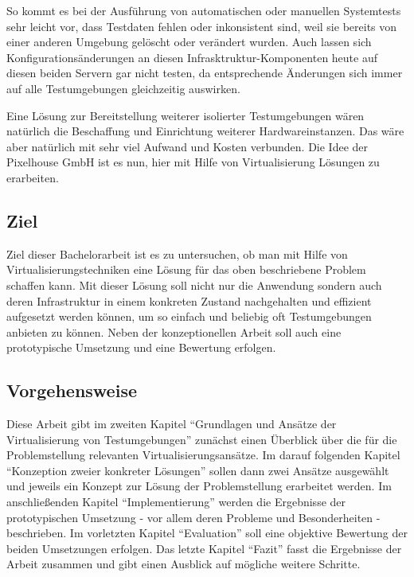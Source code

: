 So kommt es bei der Ausführung von automatischen oder manuellen Systemtests sehr leicht vor, dass Testdaten fehlen oder inkonsistent sind, weil sie bereits von einer anderen Umgebung gelöscht oder verändert wurden. Auch lassen sich Konfigurationsänderungen an diesen Infrasktruktur-Komponenten heute auf diesen beiden Servern gar nicht testen, da entsprechende Änderungen sich immer auf alle Testumgebungen gleichzeitig auswirken.

Eine Lösung zur Bereitstellung weiterer isolierter Testumgebungen wären natürlich die Beschaffung und Einrichtung weiterer Hardwareinstanzen. Das wäre aber natürlich mit sehr viel Aufwand und Kosten verbunden. Die Idee der Pixelhouse GmbH ist es nun, hier mit Hilfe von Virtualisierung Lösungen zu erarbeiten.

\subsection{Ziel}

Ziel dieser Bachelorarbeit ist es zu untersuchen, ob man mit Hilfe von Virtualisierungstechniken eine Lösung für das oben beschriebene Problem schaffen kann. Mit dieser Lösung soll nicht nur die Anwendung sondern auch deren Infrastruktur in einem konkreten Zustand nachgehalten und effizient aufgesetzt werden können, um so einfach und beliebig oft Testumgebungen anbieten zu können. Neben der konzeptionellen Arbeit soll auch eine prototypische Umsetzung und eine Bewertung erfolgen.

\subsection{Vorgehensweise}

Diese Arbeit gibt im zweiten Kapitel "`Grundlagen und Ansätze der Virtualisierung von Testumgebungen"' zunächst einen Überblick über die für die Problemstellung relevanten Virtualisierungsansätze. Im darauf folgenden Kapitel "`Konzeption zweier konkreter Lösungen"' sollen dann zwei Ansätze ausgewählt und jeweils ein Konzept zur Lösung der Problemstellung erarbeitet werden. Im anschließenden Kapitel "`Implementierung"' werden die Ergebnisse der prototypischen Umsetzung - vor allem deren Probleme und Besonderheiten - beschrieben. Im vorletzten Kapitel "`Evaluation"' soll eine objektive Bewertung der beiden Umsetzungen erfolgen. Das letzte Kapitel "`Fazit"' fasst die Ergebnisse der Arbeit zusammen und gibt einen Ausblick auf mögliche weitere Schritte.

